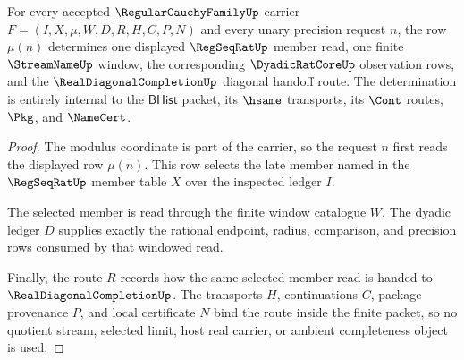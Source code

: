\begin{theorem}
\label{thm:regular-cauchy-family-modulus-window-exactness}
For every accepted $\RegularCauchyFamilyUp$ carrier $F=(I,X,\mu,W,D,R,H,C,P,N)$ and every unary precision request $n$, the row $\mu(n)$ determines one displayed $\RegSeqRatUp$ member read, one finite $\StreamNameUp$ window, the corresponding $\DyadicRatCoreUp$ observation rows, and the $\RealDiagonalCompletionUp$ diagonal handoff route. The determination is entirely internal to the $\mathsf{BHist}$ packet, its $\hsame$ transports, its $\Cont$ routes, $\Pkg$, and $\NameCert$.
\end{theorem}
\begin{proof}
The modulus coordinate is part of the carrier, so the request $n$ first reads the displayed row $\mu(n)$. This row selects the late member named in the $\RegSeqRatUp$ member table $X$ over the inspected ledger $I$.

The selected member is read through the finite window catalogue $W$. The dyadic ledger $D$ supplies exactly the rational endpoint, radius, comparison, and precision rows consumed by that windowed read.

Finally, the route $R$ records how the same selected member read is handed to $\RealDiagonalCompletionUp$. The transports $H$, continuations $C$, package provenance $P$, and local certificate $N$ bind the route inside the finite packet, so no quotient stream, selected limit, host real carrier, or ambient completeness object is used.
\end{proof}

